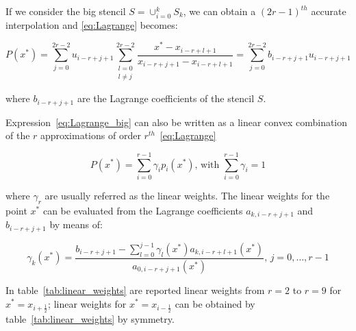 If we consider the big stencil $S = \cup_{i=0}^k S_k$, we can obtain a $(2r-1)^{th}$ accurate interpolation and \eqref{eq:Lagrange} becomes:

\begin{equation}
  \label{eq:Lagrange_big}
  P(x^*) = \sum_{j=0}^{2r-2} u_{i-r+j+1} \sum_{\substack{l=0 \\ l \neq j}}^{2r-2} \frac{x^* - x_{i-r+l+1}}{x_{i-r+j+1} - x_{i-r+l+1}} = \sum_{j=0}^{2r-2} b_{i-r+j+1} u_{i-r+j+1}
\end{equation}

where $b_{i-r+j+1}$ are the Lagrange coefficients of the stencil $S$.

Expression~\eqref{eq:Lagrange_big} can also be written as a linear convex combination of the $r$ approximations of order $r^{th}$~\eqref{eq:Lagrange}

\begin{equation}
  \label{eq:pol_convex}
  P(x^*) = \sum_{i=0}^{r-1} \gamma_i p_i(x^*) \text{, with } \sum_{i=0}^{r-1} \gamma_i = 1
\end{equation}

where $\gamma_r$ are usually referred as the linear weights. The linear weights for the point $x^*$ can be evaluated from the Lagrange coefficients $a_{k,i-r+j+1}$ and $b_{i-r+j+1}$ by means of:

\begin{equation}
  \label{eq:linear_weights}
  \gamma_k(x^*) = \frac{b_{i-r+j+1} - \sum_{l=0}^{j-1} \gamma_l(x^*) a_{k,i-r+l+1}(x^*)}{a_{0,i-r+j+1}(x^*)} \text{, } j=0, \dots, r-1
\end{equation}

In table~\ref{tab:linear_weights} are reported linear weights from $r=2$ to $r=9$ for $x^*=x_{i+\frac{1}{2}}$; linear weights for $x^*=x_{i-\frac{1}{2}}$ can be obtained by table~\ref{tab:linear_weights} by symmetry.

